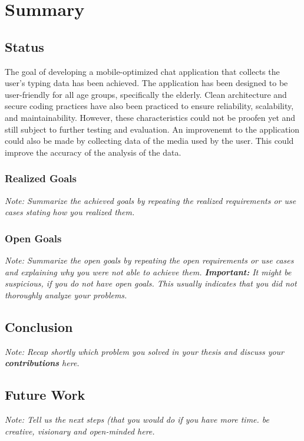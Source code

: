 \chapter{Summary}


\section{Status}


The goal of developing a mobile-optimized chat application that collects the user's typing data has been achieved.
The application has been designed to be user-friendly for all age groups, specifically the elderly.
Clean architecture and secure coding practices have also been practiced to ensure reliability, scalability, and maintainability.
However, these characteristics could not be proofen yet and still subject to further testing and evaluation.
An improvenemt to the application could also be made by collecting data of the media used by the user.
This could improve the accuracy of the analysis of the data. 

\subsection{Realized Goals}

\textit{Note: Summarize the achieved goals by repeating the realized requirements or use cases stating how you realized them.}

\subsection{Open Goals}

\textit{Note: Summarize the open goals by repeating the open requirements or use cases and explaining why you were not able to achieve them. \textbf{Important:} It might be suspicious, if you do not have open goals. This usually indicates that you did not thoroughly analyze your problems.}

\section{Conclusion}

\textit{Note: Recap shortly which problem you solved in your thesis and discuss your \textbf{contributions} here.}

\section{Future Work}

\textit{Note: Tell us the next steps  (that you would do if you have more time. be creative, visionary and open-minded here.}
